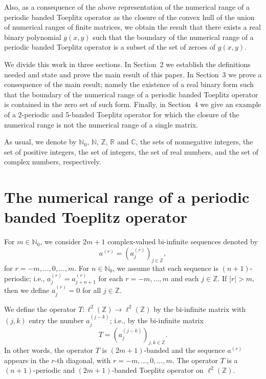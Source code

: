 \documentclass[12pt,reqno]{amsart}
\theoremstyle{definition}
\newcommand{\Z}{{\mathbb{Z}}}
\newcommand{\R}{{\mathbb{R}}}
\newcommand{\C}{{\mathbb{C}}}
\newcommand{\N}{{\mathbb{N}}}
\begin{document}
Also, as a consequence of the above representation of the numerical range of a periodic banded Toeplitz operator as the closure of the convex hull of the union of numerical ranges of finite matrices, we obtain the result that there exists a real binary polynomial $g(x,y)$ such that the boundary of the numerical range of a periodic banded Toeplitz operator is a subset of the set of zeroes of $g(x,y)$.

 

We divide this work in three sections. In Section~2 we establish the definitions needed and state and prove the main result of this paper. In Section~3 we prove a consequence of the main result; namely the existence of a real binary form such that the boundary of the numerical range of a periodic banded Toeplitz operator is contained in the zero set of such form. Finally, in Section~4 we give an example of a 2-periodic and 5-banded Toeplitz operator for which the closure of the numerical range is not the numerical range of a single matrix.

As usual, we denote by $\N_0$, $\N$, $\Z$, $\R$ and $\C$, the sets of nonnegative integers, the set of positive integers, the set of integers, the set of real numbers, and the set of complex numbers, respectively.

\section{The numerical range of a periodic banded Toeplitz operator}

For $m \in \N_0$, we consider $2m+1$ complex-valued bi-infinite sequences denoted by \[
a^{(r)}=\left(a_j^{(r)}\right)_{j \in \Z},
\]
for $r=-m, \dots, 0, \dots, m$. For $n \in \N_0$, we assume that each sequence is $(n+1)$-periodic; i.e., $a_{j}^{(r)}=a_{j+n+1}^{(r)}$ for each $r=-m, \dots, m$ and each $j \in \Z$. If $|r|>m$, then we define $a_j^{(r)}=0$ for all $j \in \Z$.

We define the operator $T : \ell^2(\Z) \to \ell^2(\Z)$ by the bi-infinite matrix with $(j,k)$ entry the number $a_{j}^{(j-k)}$; i.e., by the bi-infinite matrix 
\[
T=\left( a_{j}^{(j-k)} \right)_{j, k \in \Z}.
\]
In other words, the operator $T$ is $(2m+1)$-banded and the sequence $a^{(r)}$ appears in the $r$-th diagonal, with $r=-m, \dots, 0, \dots, m$. The operator $T$ is a $(n+1)$-periodic  and $(2m+1)$-banded Toeplitz operator on $\ell^2(\Z)$. 
\end{document}
